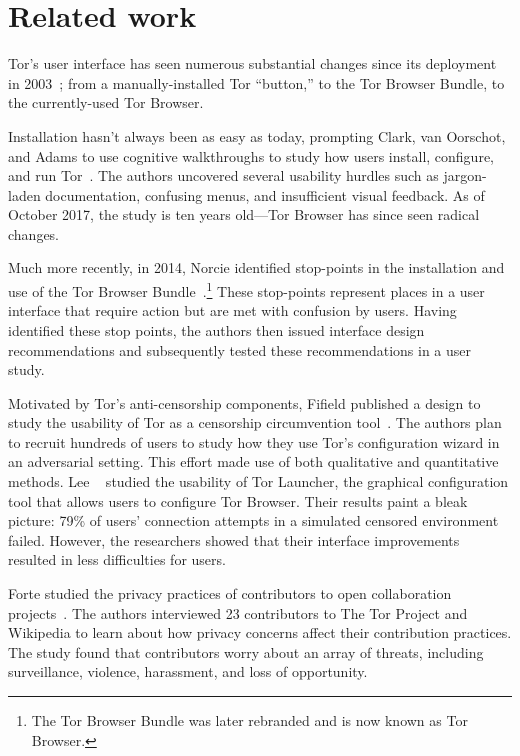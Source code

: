 \section{Related work}
\label{sec:related-work}

Tor's user interface has seen numerous substantial changes since its deployment
in 2003~\cite{Syverson2005a}; from a manually-installed Tor ``button,'' to the
Tor Browser Bundle, to the currently-used Tor Browser.

Installation hasn't always been as easy as today, prompting Clark, van Oorschot,
and Adams to use cognitive walkthroughs to study how users install, configure,
and run Tor~\cite{Clark2007a}.  The authors uncovered several usability hurdles
such as jargon-laden documentation, confusing menus, and insufficient visual
feedback.  As of October 2017, the study is ten years old---Tor Browser has
since seen radical changes.

Much more recently, in 2014, Norcie \ea identified stop-points in the
installation and use of the Tor Browser Bundle~\cite{Norcie2014a}.\footnote{The
Tor Browser Bundle was later rebranded and is now known as Tor Browser.}  These
stop-points represent places in a user interface that require action but are met
with confusion by users.  Having identified these stop points, the authors then
issued interface design recommendations and subsequently tested these
recommendations in a user study.

Motivated by Tor's anti-censorship components, Fifield \ea published a design to
study the usability of Tor as a censorship circumvention
tool~\cite{Fifield2015a}.  The authors plan to recruit hundreds of users to
study how they use Tor's configuration wizard in an adversarial setting.  This
effort made use of both qualitative and quantitative methods.  Lee
\ea~\cite{Lee2017a} studied the usability of Tor Launcher, the graphical
configuration tool that allows users to configure Tor Browser.  Their results
paint a bleak picture: 79\% of users' connection attempts in a simulated
censored environment failed.  However, the researchers showed that their
interface improvements resulted in less difficulties for users.

Forte \ea studied the privacy practices of contributors to open collaboration
projects~\cite{Forte2017a}.  The authors interviewed 23 contributors to The Tor
Project and Wikipedia to learn about how privacy concerns affect their
contribution practices.  The study found that contributors worry about an array
of threats, including surveillance, violence, harassment, and loss of
opportunity.

